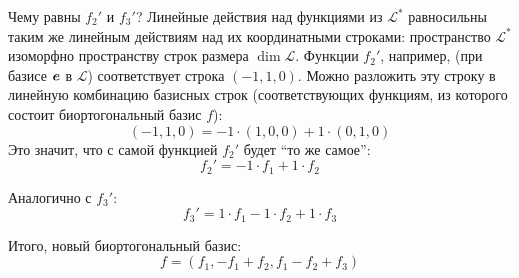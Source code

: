 \documentclass[a4paper,12pt]{article}
\begin{document}
\begin{solution}
    Чему равны $f_2'$ и $f_3'$?
    Линейные действия над функциями из $\mathcal L^*$ равносильны таким же линейным действиям над их координатными строками: пространство $\mathcal L^*$ изоморфно пространству строк размера $\dim\mathcal L$.
    Функции $f_2'$, например, (при базисе $\boldsymbol e$ в $\mathcal L$) соответствует строка $(-1, 1, 0)$.
    Можно разложить эту строку в линейную комбинацию базисных строк (соответствующих функциям, из которого состоит биортогональный базис $f$):
    \[
      (-1, 1, 0) = -1 \cdot (1, 0, 0) + 1 \cdot (0, 1, 0)
    \]
    Это значит, что с самой функцией $f_2'$ будет ``то же самое'':
    \[
      f_2' = -1 \cdot f_1 + 1 \cdot f_2
    \]
    
    Аналогично с $f_3'$:
    \[
      f_3' = 1 \cdot f_1 - 1 \cdot f_2 + 1 \cdot f_3
    \]
    
    Итого, новый биортогональный базис:
    \[
      f = (f_1, -f_1 + f_2, f_1 - f_2 + f_3)
    \]
  \end{solution}
\end{document}
